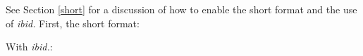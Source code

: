 \documentclass[11pt,letterpaper,oneside]{article}
\begin{document}
See Section \ref{short} for a discussion of how to enable the short
format and the use of \textit{ibid.} First, the short format:

\begin{citeonly}
\item \cite[3]{morrison2004a}
\item \cite[18]{morrison2004a}
\item \cite[18]{morrison2004a}
\item \cite[24--26]{morrison2004a}
\item \cite[401-2]{morrison2004b}
\item \cite[433]{morrison2004b}
\item \cite[37--38]{diaz2008}
\item \cite[403]{morrison2004b}
\item \cite[152]{diaz2008}
\item \cite[201-2]{diaz2008}
\item \cites[240]{morrison2004b}[32]{morrison2004a}
 \item \cite[33]{morrison2004a}
\end{citeonly}

\noindent With \textit{ibid.}:
\end{document}
